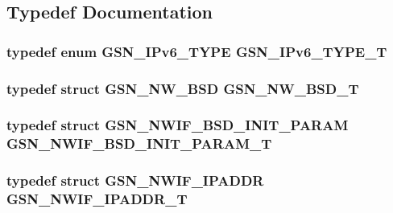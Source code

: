 \subsection{Typedef Documentation}
\hypertarget{a00534_aac8a8005b7e88e230928699f1b2cc0d2}{
\subsubsection[{GSN\_\-IPv6\_\-TYPE\_\-T}]{\setlength{\rightskip}{0pt plus 5cm}typedef enum {\bf GSN\_\-IPv6\_\-TYPE} {\bf GSN\_\-IPv6\_\-TYPE\_\-T}}}
\label{a00534_aac8a8005b7e88e230928699f1b2cc0d2}
\hypertarget{a00534_ac7a3fb17a7a529ae15ceec860b9db964}{
\subsubsection[{GSN\_\-NW\_\-BSD\_\-T}]{\setlength{\rightskip}{0pt plus 5cm}typedef struct {\bf GSN\_\-NW\_\-BSD} {\bf GSN\_\-NW\_\-BSD\_\-T}}}
\label{a00534_ac7a3fb17a7a529ae15ceec860b9db964}
\hypertarget{a00534_a715283228c86aaa90a9329f01dec6287}{
\subsubsection[{GSN\_\-NWIF\_\-BSD\_\-INIT\_\-PARAM\_\-T}]{\setlength{\rightskip}{0pt plus 5cm}typedef struct {\bf GSN\_\-NWIF\_\-BSD\_\-INIT\_\-PARAM} {\bf GSN\_\-NWIF\_\-BSD\_\-INIT\_\-PARAM\_\-T}}}
\label{a00534_a715283228c86aaa90a9329f01dec6287}
\hypertarget{a00534_afc14e738a321ca724b331f740ee59e14}{
\subsubsection[{GSN\_\-NWIF\_\-IPADDR\_\-T}]{\setlength{\rightskip}{0pt plus 5cm}typedef struct {\bf GSN\_\-NWIF\_\-IPADDR}  {\bf GSN\_\-NWIF\_\-IPADDR\_\-T}}}

